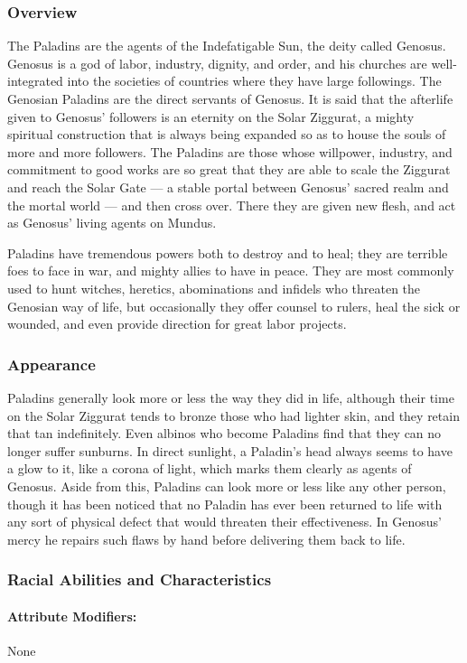 \documentclass[oneside,11pt,english]{book}
\begin{document}
\subsubsection*{Overview} 
The Paladins are the agents of the Indefatigable Sun, the deity called Genosus. Genosus is a god of labor, 
industry, dignity, and order, and his churches are well-integrated into the societies of countries where they 
have large followings. The Genosian Paladins are the direct servants of Genosus. It is said that the 
afterlife given to Genosus' followers is an eternity on the Solar Ziggurat, a mighty spiritual construction 
that is always being expanded so as to house the souls of more and more followers. The Paladins are those 
whose willpower, industry, and commitment to good works are so great that they are able to scale the 
Ziggurat and reach the Solar Gate — a stable portal between Genosus' sacred realm and the mortal world — and then cross over. There they are given new flesh, and act as Genosus' living agents on Mundus.

Paladins have tremendous powers both to destroy and to heal; they are terrible foes to face in war, and 
mighty allies to have in peace. They are most commonly used to hunt witches, heretics, abominations and 
infidels who threaten the Genosian way of life, but occasionally they offer counsel to rulers, heal the sick 
or wounded, and even provide direction for great labor projects. 
\subsubsection*{Appearance} 
Paladins generally look more or less the way they did in life, although their time on the Solar Ziggurat 
tends to bronze those who had lighter skin, and they retain that tan indefinitely. Even albinos who become 
Paladins find that they can no longer suffer sunburns. In direct sunlight, a Paladin's head always seems to 
have a glow to it, like a corona of light, which marks them clearly as agents of Genosus. Aside from this, 
Paladins can look more or less like any other person, though it has been noticed that no Paladin has ever 
been returned to life with any sort of physical defect that would threaten their effectiveness. In Genosus' 
mercy he repairs such flaws by hand before delivering them back to life. 
\subsubsection*{Racial Abilities and Characteristics} 
\paragraph{Attribute Modifiers:} None 
\end{document}
